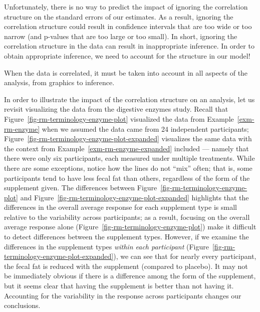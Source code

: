 \documentclass[
  letterpaper,
  DIV=11,
  numbers=noendperiod]{scrreprt}
\theoremstyle{definition}
\theoremstyle{definition}
\theoremstyle{remark}
\begin{document}
Unfortunately, there is no way to predict the impact of ignoring the
correlation structure on the standard errors of our estimates. As a
result, ignoring the correlation structure could result in confidence
intervals that are too wide or too narrow (and p-values that are too
large or too small). In short, ignoring the correlation structure in the
data can result in inappropriate inference. In order to obtain
appropriate inference, we need to account for the structure in our
model!

\begin{tcolorbox}[enhanced jigsaw, left=2mm, toprule=.15mm, arc=.35mm, breakable, opacitybacktitle=0.6, opacityback=0, rightrule=.15mm, colbacktitle=quarto-callout-tip-color!10!white, coltitle=black, leftrule=.75mm, toptitle=1mm, colframe=quarto-callout-tip-color-frame, titlerule=0mm, title=\textcolor{quarto-callout-tip-color}{\faLightbulb}\hspace{0.5em}{Big Idea}, bottomrule=.15mm, colback=white, bottomtitle=1mm]

When the data is correlated, it must be taken into account in all
aspects of the analysis, from graphics to inference.

\end{tcolorbox}

In order to illustrate the impact of the correlation structure on an
analysis, let us revisit visualizing the data from the digestive enzymes
study. Recall that Figure~\ref{fig-rm-terminology-enzyme-plot}
visualized the data from Example~\ref{exm-rm-enzyme} when we assumed the
data came from 24 independent participants;
Figure~\ref{fig-rm-terminology-enzyme-plot-expanded} visualizes the same
data with the context from Example~\ref{exm-rm-enzyme-expanded} included
--- namely that there were only six participants, each measured under
multiple treatments. While there are some exceptions, notice how the
lines do not ``mix'' often; that is, some participants tend to have less
fecal fat than others, regardless of the form of the supplement given.
The differences between Figure~\ref{fig-rm-terminology-enzyme-plot} and
Figure~\ref{fig-rm-terminology-enzyme-plot-expanded} highlights that the
differences in the overall average response for each supplement type is
small relative to the variability across participants; as a result,
focusing on the overall average response alone
(Figure~\ref{fig-rm-terminology-enzyme-plot}) make it difficult to
detect differences between the supplement types. However, if we examine
the differences in the supplement types \emph{within each participant}
(Figure~\ref{fig-rm-terminology-enzyme-plot-expanded}), we can see that
for nearly every participant, the fecal fat is reduced with the
supplement (compared to placebo). It may not be immediately obvious if
there is a difference among the form of the supplement, but it seems
clear that having the supplement is better than not having it.
Accounting for the variability in the response across participants
changes our conclusions.
\end{document}
